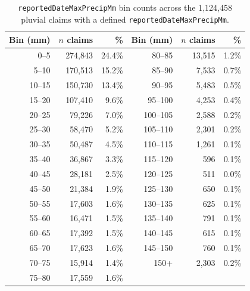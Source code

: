 \begin{table}[h]
\centering
\begin{tabular}{rrr@{\hspace{2em}}rrr}
\toprule
Bin (mm) & $n$ claims & \% & Bin (mm) & $n$ claims & \% \\
\midrule
0--5 & 274,843 & 24.4\% & 80--85 & 13,515 & 1.2\% \\
5--10 & 170,513 & 15.2\% & 85--90 & 7,533 & 0.7\% \\
10--15 & 150,730 & 13.4\% & 90--95 & 5,483 & 0.5\% \\
15--20 & 107,410 & 9.6\% & 95--100 & 4,253 & 0.4\% \\
20--25 & 79,226 & 7.0\% & 100--105 & 2,588 & 0.2\% \\
25--30 & 58,470 & 5.2\% & 105--110 & 2,301 & 0.2\% \\
30--35 & 50,487 & 4.5\% & 110--115 & 1,261 & 0.1\% \\
35--40 & 36,867 & 3.3\% & 115--120 & 596 & 0.1\% \\
40--45 & 28,181 & 2.5\% & 120--125 & 511 & 0.0\% \\
45--50 & 21,384 & 1.9\% & 125--130 & 650 & 0.1\% \\
50--55 & 17,603 & 1.6\% & 130--135 & 625 & 0.1\% \\
55--60 & 16,471 & 1.5\% & 135--140 & 791 & 0.1\% \\
60--65 & 17,392 & 1.5\% & 140--145 & 615 & 0.1\% \\
65--70 & 17,623 & 1.6\% & 145--150 & 760 & 0.1\% \\
70--75 & 15,914 & 1.4\% & 150+ & 2,303 & 0.2\% \\
75--80 & 17,559 & 1.6\% &  & &  \\
\bottomrule
\end{tabular}
\caption{\texttt{reportedDateMaxPrecipMm} bin counts across the 1,124,458 pluvial claims with a defined \texttt{reportedDateMaxPrecipMm}.}
\label{tab:precip-histogram}
\end{table}
